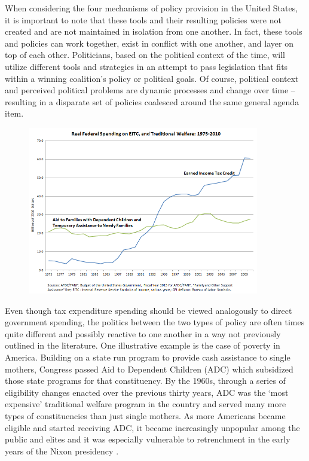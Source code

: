 \documentclass[12pt]{article}
\begin{document}
When considering the four mechanisms of policy provision in the United States, it is important to note that these tools and their resulting policies were not created and are not maintained in isolation from one another. In fact, these tools and policies can work together, exist in conflict with one another, and layer on top of each other. Politicians, based on the political context of the time, will utilize different tools and strategies in an attempt to pass legislation that fits within a winning coalition's policy or political goals. Of course, political context and perceived political problems are dynamic processes and change over time -- resulting in a disparate set of policies coalesced around the same general agenda item.
\begin{figure}[h!]
  \centering
\includegraphics[width=0.9\textwidth]{graph.png}
\end{figure}

Even though tax expenditure spending should be viewed analogously to direct government spending, the politics between the two types of policy are often times quite different and possibly reactive to one another in a way not previously outlined in the literature. One illustrative example is the case of poverty in America. Building on a state run program to provide cash assistance to single mothers, Congress passed Aid to Dependent Children (ADC) which subsidized those state programs for that constituency. By the 1960s, through a series of eligibility changes enacted over the previous thirty years, ADC was the `most expensive' traditional welfare program in the country and served many more types of constituencies than just single mothers. As more Americans became eligible and started receiving ADC, it became increasingly unpopular among the public and elites and it was especially vulnerable to retrenchment in the early years of the Nixon presidency \citep{moynihan1973}. 
\end{document}
